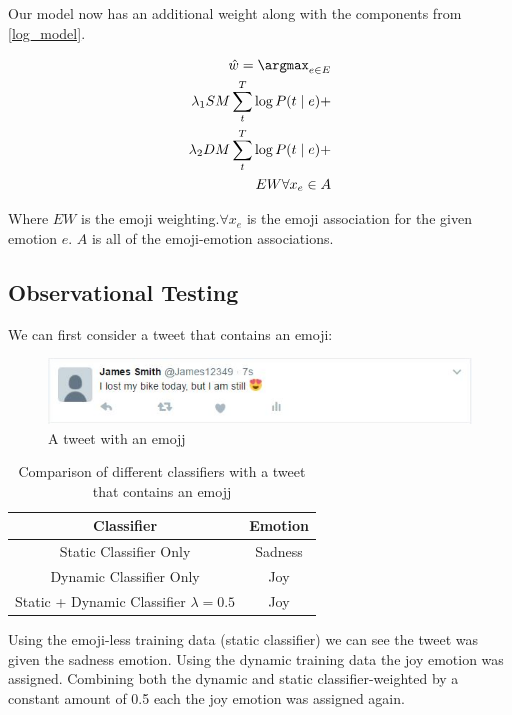 {Our model now has an additional weight along with the components from \ref{log_model}.

\begin{equation}
\begin{split}
\hat{w} = \argmax_{e \in E} \\ \lambda_1 SM \sum_{t}^{T} \log P(t \mid e)  + \\ \lambda_2 DM \sum_{t}^{T} \log P(t \mid e) + \\ EW \forall x_e \in A
\end{split}
\end{equation}

Where $EW$ is the emoji weighting.$ \forall x_e$ is the emoji association for the given emotion $e$. $A$ is all of the emoji-emotion associations.

\subsection{Observational Testing}

We can first consider a tweet that contains an emoji:

\begin{figure}[H]
\center
\includegraphics[width=15cm]{images/emoj_tweet.JPG}
\caption{A tweet with an emojj}
\end{figure}

\begin{table}[H]
\center
 \begin{tabular}{|c|c|} 
 \hline
 \textbf{Classifier} & \textbf{Emotion} \\ [0.5ex] 
 \hline
 Static Classifier Only & Sadness \\ 
 \hline
 Dynamic Classifier Only & Joy \\
 \hline
 Static + Dynamic Classifier $\lambda = 0.5$ & Joy \\
 \hline
\end{tabular}
\caption{Comparison of different classifiers with a tweet that contains an emojj}
\end{table}

Using the emoji-less training data (static classifier) we can see the tweet was given the sadness emotion. Using the dynamic training data the joy emotion was assigned. Combining both the dynamic and static classifier-weighted by a constant amount of 0.5 each the joy emotion was assigned again.

}
